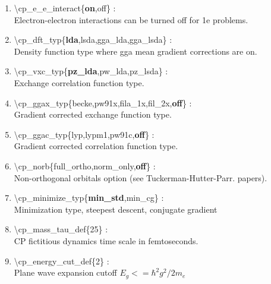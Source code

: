\documentclass[12pt,titlepage]{article}
\begin{document}
\begin{enumerate}

 \vspace{0.15in} 
 \item  \textbackslash{}cp\_e\_e\_interact\{{\bf on},off\} : \\
     Electron-electron interactions can be turned off for 1e problems.

 \vspace{0.15in} 
 \item  \textbackslash{}cp\_dft\_typ\{{\bf lda},lsda,gga\_lda,gga\_lsda\} : \\
     Density function type where gga mean gradient corrections are on.

 \vspace{0.15in} 
 \item  \textbackslash{}cp\_vxc\_typ\{{\bf pz\_lda},pw\_lda,pz\_lsda\} : \\
     Exchange correlation function type.

 \vspace{0.15in} 
 \item  \textbackslash{}cp\_ggax\_typ\{becke,pw91x,fila\_1x,fil\_2x,{\bf off}\} : \\
     Gradient corrected exchange function type.

 \vspace{0.15in} 
 \item  \textbackslash{}cp\_ggac\_typ\{lyp,lypm1,pw91c,{\bf off}\} : \\
     Gradient corrected correlation function type.

 \vspace{0.15in} 
 \item  \textbackslash{}cp\_norb\{full\_ortho,norm\_only,{\bf off}\} : \\
     Non-orthogonal orbitals option (see Tuckerman-Hutter-Parr. papers).

 \vspace{0.15in} 
 \item  \textbackslash{}cp\_minimize\_typ\{{\bf min\_std},min\_cg\} : \\
      Minimization type, steepest descent, conjugate gradient 

 \vspace{0.15in} 
 \item  \textbackslash{}cp\_mass\_tau\_def\{25\} : \\
      CP fictitious dynamics time scale in femtoseconds.

 \vspace{0.15in} 
 \item  \textbackslash{}cp\_energy\_cut\_def\{2\} : \\
      Plane wave expansion cutoff $E_g<=\hbar^2g^2/2m_e$ 


\end{enumerate}
\end{document}
